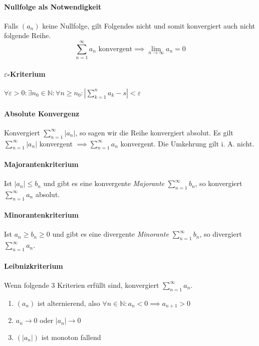 \documentclass[a4paper, 9pt, DIV=24]{scrartcl}
\newcommand{\N}{\mathbb{N}}
\begin{document}
\paragraph{Nullfolge als Notwendigkeit}
Falls $(a_n)$ keine Nullfolge, gilt Folgendes nicht und somit konvergiert auch nicht folgende Reihe.
\[ \sum_{n=1}^\infty a_n \text{ konvergent} \implies \lim_{n \to \infty} a_n = 0 \]

\paragraph{$\varepsilon$-Kriterium}
$\forall \varepsilon > 0: \exists n_0 \in \N: \forall n \geq n_0: | \sum_{k=1}^n a_k - s | < \varepsilon$

\paragraph{Absolute Konvergenz}
Konvergiert $\sum_{n=1}^\infty |a_n|$, so sagen wir die Reihe konvergiert absolut.
Es gilt $\sum_{n=1}^\infty |a_n|$ konvergent $ \implies \sum_{n=1}^\infty a_n$ konvergent.
Die Umkehrung gilt i. A. nicht.

\paragraph{Majorantenkriterium}
Ist $|a_n| \leq b_n$ und gibt es eine konvergente \emph{Majorante} $\sum_{n=1}^\infty b_n$, so konvergiert $\sum_{n=1}^\infty a_n$ absolut.

\paragraph{Minorantenkriterium}
Ist $a_n \geq b_n \geq 0$ und gibt es eine divergente \emph{Minorante} $\sum_{n=1}^\infty b_n$, so divergiert $\sum_{n=1}^\infty a_n$.

\paragraph{Leibnizkriterium}
Wenn folgende 3 Kriterien erfüllt sind, konvergiert $\sum_{n=1}^\infty a_n$.
\begin{enumerate}[label={(}\arabic*{)}]
  \item $(a_n)$ ist alternierend, also $\forall n\in\N: a_n < 0 \implies a_{n+1} > 0$
  \item $a_n \to 0$ oder $|a_n| \to 0$
  \item $(|a_n|)$ ist monoton fallend
\end{enumerate}
\end{document}
